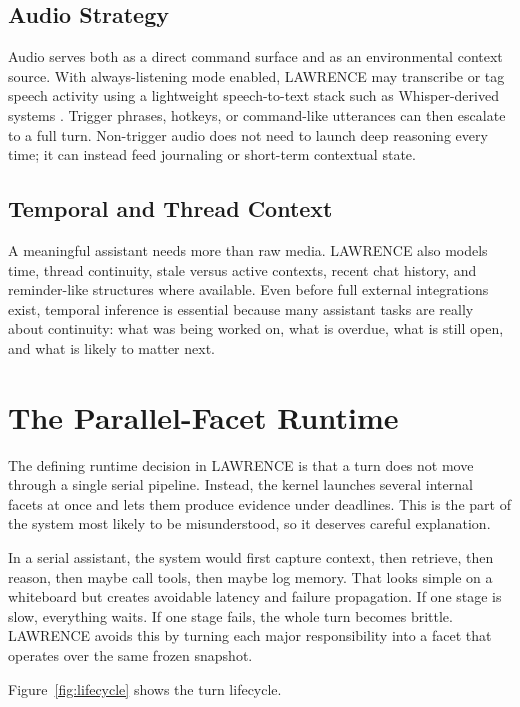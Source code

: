 \documentclass[conference]{IEEEtran}
\begin{document}
\subsection{Audio Strategy}
Audio serves both as a direct command surface and as an environmental context source. With always-listening mode enabled, LAWRENCE may transcribe or tag speech activity using a lightweight speech-to-text stack such as Whisper-derived systems \cite{radford2022whisper}. Trigger phrases, hotkeys, or command-like utterances can then escalate to a full turn. Non-trigger audio does not need to launch deep reasoning every time; it can instead feed journaling or short-term contextual state.

\subsection{Temporal and Thread Context}
A meaningful assistant needs more than raw media. LAWRENCE also models time, thread continuity, stale versus active contexts, recent chat history, and reminder-like structures where available. Even before full external integrations exist, temporal inference is essential because many assistant tasks are really about continuity: what was being worked on, what is overdue, what is still open, and what is likely to matter next.

\section{The Parallel-Facet Runtime}
The defining runtime decision in LAWRENCE is that a turn does not move through a single serial pipeline. Instead, the kernel launches several internal facets at once and lets them produce evidence under deadlines. This is the part of the system most likely to be misunderstood, so it deserves careful explanation.

In a serial assistant, the system would first capture context, then retrieve, then reason, then maybe call tools, then maybe log memory. That looks simple on a whiteboard but creates avoidable latency and failure propagation. If one stage is slow, everything waits. If one stage fails, the whole turn becomes brittle. LAWRENCE avoids this by turning each major responsibility into a facet that operates over the same frozen snapshot.

Figure~\ref{fig:lifecycle} shows the turn lifecycle.
\end{document}
